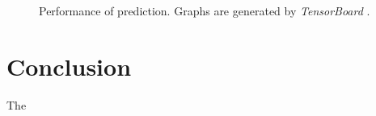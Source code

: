 \begin{figure} %
	\centering
	
	
	\caption{Performance of prediction. Graphs are generated by \textit{TensorBoard} \cite{tensorflow2015-whitepaper}.}
	\label{fig:prediction}
\end{figure}

\section{Conclusion}
The 

